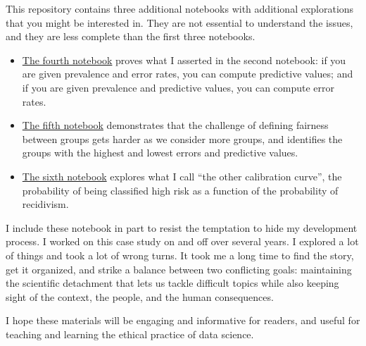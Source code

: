 This repository contains three additional notebooks with additional
explorations that you might be interested in. They are not essential to
understand the issues, and they are less complete than the first three
notebooks.

\begin{itemize}
\item
  \href{https://colab.research.google.com/github/AllenDowney/RecidivismCaseStudy/blob/master/04_matrix.ipynb}{The
  fourth notebook} proves what I asserted in the second notebook: if you
  are given prevalence and error rates, you can compute predictive
  values; and if you are given prevalence and predictive values, you can
  compute error rates.
\item
  \href{https://colab.research.google.com/github/AllenDowney/RecidivismCaseStudy/blob/master/05_subgroups.ipynb}{The
  fifth notebook} demonstrates that the challenge of defining fairness
  between groups gets harder as we consider more groups, and identifies
  the groups with the highest and lowest errors and predictive values.
\item
  \href{https://colab.research.google.com/github/AllenDowney/RecidivismCaseStudy/blob/master/06_error.ipynb}{The
  sixth notebook} explores what I call ``the other calibration curve'',
  the probability of being classified high risk as a function of the
  probability of recidivism.
\end{itemize}

I include these notebook in part to resist the temptation to hide my
development process. I worked on this case study on and off over several
years. I explored a lot of things and took a lot of wrong turns. It took
me a long time to find the story, get it organized, and strike a balance
between two conflicting goals: maintaining the scientific detachment
that lets us tackle difficult topics while also keeping sight of the
context, the people, and the human consequences.

I hope these materials will be engaging and informative for readers, and
useful for teaching and learning the ethical practice of data science.
